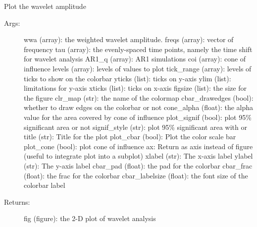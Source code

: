 \documentclass[letterpaper,10pt,english]{sphinxmanual}
\begin{document}
\begin{fulllineitems}
\label{\detokenize{Spectral:pyleoclim.Spectral.plot_wwa}}
Plot the wavelet amplitude
\begin{description}
\item[{Args:}] \leavevmode
wwa (array): the weighted wavelet amplitude.
freqs (array): vector of frequency
tau (array): the evenly-spaced time points, namely the time shift for wavelet analysis
AR1\_q (array): AR1 simulations
coi (array): cone of influence
levels (array): levels of values to plot
tick\_range (array): levels of ticks to show on the colorbar
yticks (list): ticks on y-axis
ylim (list): limitations for y-axis
xticks (list): ticks on x-axis
figsize (list): the size for the figure
clr\_map (str): the name of the colormap
cbar\_drawedges (bool): whether to draw edges on the colorbar or not
cone\_alpha (float): the alpha value for the area covered by cone of influence
plot\_signif (bool): plot 95\% significant area or not
signif\_style (str): plot 95\% significant area with  or 
title (str): Title for the plot
plot\_cbar (bool): Plot the color scale bar
plot\_cone (bool): plot cone of influence
ax: Return as axis instead of figure (useful to integrate plot into a subplot)
xlabel (str): The x-axis label
ylabel (str): The y-axis label
cbar\_pad (float): the pad for the colorbar
cbar\_frac (float): the frac for the colorbar
cbar\_labelsize (float): the font size of the colorbar label

\item[{Returns:}] \leavevmode
fig (figure): the 2-D plot of wavelet analysis

\end{description}

\end{fulllineitems}

\end{document}

